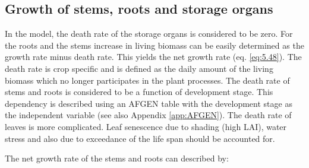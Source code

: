 %
%

\subsection{Growth of stems, roots and storage organs}

In the model, the death rate of the storage organs is considered to be zero. For the roots
and the stems increase in living biomass can be easily determined as the growth rate
minus death rate. This yields the net growth rate (eq. \ref{eq:5.48}). The death rate is crop
specific and is defined as the daily amount of the living biomass which no longer
participates in the plant processes. The death rate of stems and roots is considered to be a
function of development stage. This dependency is described using an
AFGEN table with the development stage as the independent variable (see also Appendix
\ref{app:AFGEN}). The death rate of leaves is more complicated. Leaf senescence due to shading (high
LAI), water stress and also due to exceedance of the life span should be accounted for.

The net growth rate of the stems and roots can described by:

